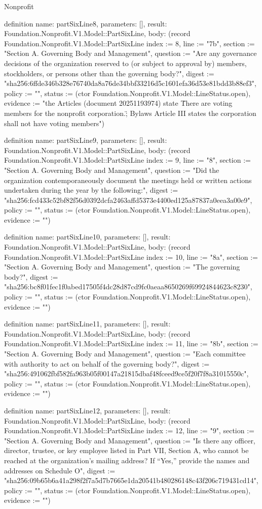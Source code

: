 \begin{lexlean}{Nonprofit}
\begin{semanticmodule}
definition{
  name: partSixLine8,
  parameters: [],
  result: Foundation.Nonprofit.V1.Model::PartSixLine,
  body: (record Foundation.Nonprofit.V1.Model::PartSixLine {index := 8, line := "7b", section := "Section A. Governing Body and Management", question := "Are any governance decisions of the organization reserved to (or subject to approval by) members, stockholders, or persons other than the governing body?", digest := "sha256:6ffde346b328e76740da8a76de34bbf33216d5c1601efa36d53e81bdd3b88ef3", policy := "", status := (ctor Foundation.Nonprofit.V1.Model::LineStatus.open), evidence := "the Articles (document 20251193974) state \"There are voting members for the nonprofit corporation.\"; Bylaws Article III states the corporation shall not have voting members"})
}

definition{
  name: partSixLine9,
  parameters: [],
  result: Foundation.Nonprofit.V1.Model::PartSixLine,
  body: (record Foundation.Nonprofit.V1.Model::PartSixLine {index := 9, line := "8", section := "Section A. Governing Body and Management", question := "Did the organization contemporaneously document the meetings held or written actions undertaken during the year by the following:", digest := "sha256:fcd433c52bf82f56d0392dcfa2463affd5373e4400ed125a87837a0eea3a00e9", policy := "", status := (ctor Foundation.Nonprofit.V1.Model::LineStatus.open), evidence := ""})
}

definition{
  name: partSixLine10,
  parameters: [],
  result: Foundation.Nonprofit.V1.Model::PartSixLine,
  body: (record Foundation.Nonprofit.V1.Model::PartSixLine {index := 10, line := "8a", section := "Section A. Governing Body and Management", question := "The governing body?", digest := "sha256:bc8f01fec1f0abed17505f4dc28d87cd9fc0aeaa8650269f69924844623c8230", policy := "", status := (ctor Foundation.Nonprofit.V1.Model::LineStatus.open), evidence := ""})
}

definition{
  name: partSixLine11,
  parameters: [],
  result: Foundation.Nonprofit.V1.Model::PartSixLine,
  body: (record Foundation.Nonprofit.V1.Model::PartSixLine {index := 11, line := "8b", section := "Section A. Governing Body and Management", question := "Each committee with authority to act on behalf of the governing body?", digest := "sha256:491062fbf582fa963b05f00147a21815dbaf48fceed9ce5f20f7f8a31015550c", policy := "", status := (ctor Foundation.Nonprofit.V1.Model::LineStatus.open), evidence := ""})
}

definition{
  name: partSixLine12,
  parameters: [],
  result: Foundation.Nonprofit.V1.Model::PartSixLine,
  body: (record Foundation.Nonprofit.V1.Model::PartSixLine {index := 12, line := "9", section := "Section A. Governing Body and Management", question := "Is there any officer, director, trustee, or key employee listed in Part VII, Section A, who cannot be reached at the organization’s mailing address? If “Yes,” provide the names and addresses on Schedule O", digest := "sha256:09b65b6a41a298f2f7a5d7b7665e1da20541b480286148c43f206c719431cd14", policy := "", status := (ctor Foundation.Nonprofit.V1.Model::LineStatus.open), evidence := ""})
}


\end{semanticmodule}
\end{lexlean}
